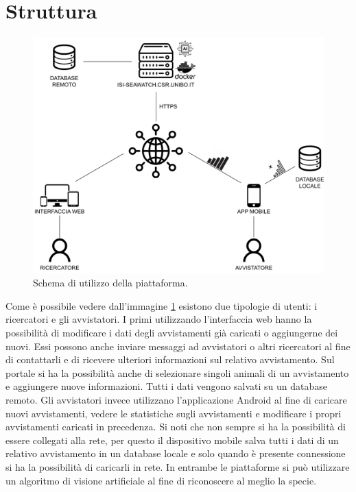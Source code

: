 \documentclass[a4paper,final,12pt]{report}
\begin{document}
\section{Struttura}
\begin{figure}[hbtp]
\centering
\includegraphics[scale=0.35]{img_concettuale/sistema.png}
\caption{Schema di utilizzo della piattaforma.}
\label{figura:piattaforma}
\end{figure}
Come è possibile vedere dall'immagine \ref{figura:piattaforma} esistono due tipologie di utenti: i ricercatori e gli avvistatori. I primi utilizzando l'interfaccia web hanno la possibilità di modificare i dati degli avvistamenti già caricati o aggiungerne dei nuovi. Essi possono anche inviare messaggi ad avvistatori o altri ricercatori al fine di contattarli e di ricevere ulteriori informazioni sul relativo avvistamento. Sul portale si ha la possibilità anche di selezionare singoli animali di un avvistamento e aggiungere nuove informazioni. Tutti i dati vengono salvati su un database remoto. Gli avvistatori invece utilizzano l'applicazione Android al fine di caricare nuovi avvistamenti, vedere le statistiche sugli avvistamenti e modificare i propri avvistamenti caricati in precedenza. Si noti che non sempre si ha la possibilità di essere collegati alla rete, per questo il dispositivo mobile salva tutti i dati di un relativo avvistamento in un database locale e solo quando è presente connessione si ha la possibilità di caricarli in rete. In entrambe le piattaforme si può utilizzare un algoritmo di visione artificiale al fine di riconoscere al meglio la specie.
\end{document}
